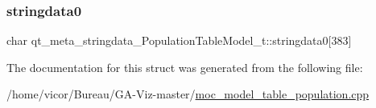 \subsubsection{\texorpdfstring{stringdata0}{stringdata0}}
{\footnotesize\ttfamily char qt\+\_\+meta\+\_\+stringdata\+\_\+\+Population\+Table\+Model\+\_\+t\+::stringdata0\mbox{[}383\mbox{]}}



The documentation for this struct was generated from the following file\+:\begin{DoxyCompactItemize}
\item 
/home/vicor/\+Bureau/\+G\+A-\/\+Viz-\/master/\hyperlink{moc__model__table__population_8cpp}{moc\+\_\+model\+\_\+table\+\_\+population.\+cpp}\end{DoxyCompactItemize}
